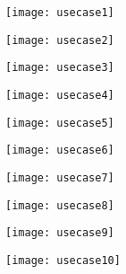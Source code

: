 \documentclass[10pt, a4paper, oneside]{article}
\begin{document}
\begin{figure}[h]
\centerline{\texttt{[image: usecase1]} }
\end{figure}
\newpage
\begin{figure}[h]
\centerline{\texttt{[image: usecase2]} }
\end{figure}
\newpage
\begin{figure}[h]
\centerline{\texttt{[image: usecase3]} }
\end{figure}
\newpage
\begin{figure}[h]
\centerline{\texttt{[image: usecase4]} }
\end{figure}
\newpage
\begin{figure}[h]
\centerline{\texttt{[image: usecase5]} }
\end{figure}
\newpage
\begin{figure}[h]
\centerline{\texttt{[image: usecase6]} }
\end{figure}
\newpage
\begin{figure}[h]
\centerline{\texttt{[image: usecase7]} }
\end{figure}
\newpage
\begin{figure}[h]
\centerline{\texttt{[image: usecase8]} }
\end{figure}
\newpage
\begin{figure}[h]
\centerline{\texttt{[image: usecase9]} }
\end{figure}
\newpage
\begin{figure}[h]
\centerline{\texttt{[image: usecase10]} }
\end{figure}
\newpage
\end{document}
